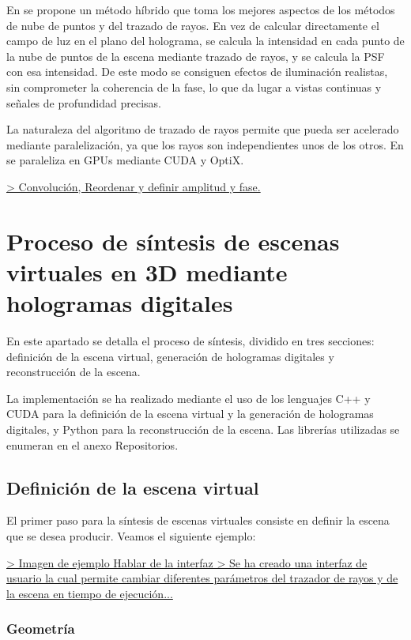 \documentclass[10pt, a4paper]{article}
\begin{document}
En \cite{Blinder:2021} se propone un método híbrido que toma los mejores aspectos de los métodos de nube de puntos y del trazado de rayos. En vez de calcular directamente el campo de luz en el plano del holograma, se calcula la intensidad en cada punto de la nube de puntos de la escena mediante trazado de rayos, y se calcula la PSF con esa intensidad. De este modo se consiguen efectos de iluminación realistas, sin comprometer la coherencia de la fase, lo que da lugar a vistas continuas y señales de profundidad precisas.

La naturaleza del algoritmo de trazado de rayos permite que pueda ser acelerado mediante paralelización, ya que los rayos son independientes unos de los otros. En \cite{Blinder:2021} se paraleliza en GPUs mediante CUDA y OptiX.

\underline{ > Convolución, Reordenar y definir amplitud y fase.
}

\section{Proceso de síntesis de escenas virtuales en 3D mediante hologramas digitales}

En este apartado se detalla el proceso de síntesis, dividido en tres secciones: definición de la escena virtual, generación de hologramas digitales y reconstrucción de la escena.

La implementación se ha realizado mediante el uso de los lenguajes C++ y CUDA para la definición de la escena virtual y la generación de hologramas digitales, y Python para la reconstrucción de la escena. Las librerías utilizadas se enumeran en el anexo Repositorios.

\subsection{Definición de la escena virtual}

El primer paso para la síntesis de escenas virtuales consiste en definir la escena que se desea producir. Veamos el siguiente ejemplo:

\underline{> Imagen de ejemplo
Hablar de la interfaz
> Se ha creado una interfaz de usuario la cual permite cambiar diferentes parámetros del trazador de rayos y de la escena en tiempo de ejecución...}

\subsubsection{Geometría}
\end{document}

